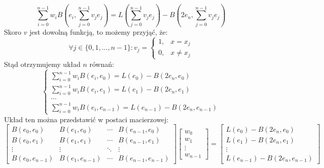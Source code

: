 \documentclass[a4paper,12pt]{article}
\begin{document}
    \begin{equation*}
        \sum_{i=0}^{n-1} w_i B\left(e_i, \sum_{j=0}^{n-1} v_j e_j\right) = L\left(\sum_{j=0}^{n-1} v_j e_j\right)-B\left(2e_n, \sum_{j=0}^{n-1} v_j e_j\right)
    \end{equation*}
    Skoro \(v\) jest dowolną funkcją, to możemy przyjąć, że:
    \begin{equation*}
        \forall j \in \{0,1,...,n-1\}: v_j = 
        \begin{cases}
            1,& x = x_j \\
            0,& x \neq x_j
        \end{cases}
    \end{equation*}
    Stąd otrzymujemy układ \(n\) równań:
    \begin{equation*}
        \begin{cases}
            \sum_{i=0}^{n-1} w_i B\left(e_i, e_0\right) = L\left(e_0\right)-B\left(2e_n, e_0\right) \\
            \sum_{i=0}^{n-1} w_i B\left(e_i, e_1\right) = L\left(e_1\right)-B\left(2e_n, e_1\right) \\
            \ldots \\
            \sum_{i=0}^{n-1} w_i B\left(e_i, e_{n-1}\right) = L\left(e_{n-1}\right)-B\left(2e_n, e_{n-1}\right)
        \end{cases}
    \end{equation*}
    Układ ten można przedstawić w postaci macierzowej:
    {\footnotesize
    \begin{equation*}
        \begin{bmatrix}
            B\left(e_0, e_0\right) & B\left(e_1, e_0\right) & \cdots & B\left(e_{n-1}, e_0\right) \\
            B\left(e_0, e_1\right) & B\left(e_1, e_1\right) & \cdots & B\left(e_{n-1}, e_1\right) \\
            \vdots & \vdots & \ddots & \vdots \\
            B\left(e_0, e_{n-1}\right) & B\left(e_1, e_{n-1}\right) & \cdots & B\left(e_{n-1}, e_{n-1}\right)
        \end{bmatrix}
        \begin{bmatrix}
            w_0 \\
            w_1 \\
            \vdots \\
            w_{n-1}
        \end{bmatrix}
        =
        \begin{bmatrix}
            L\left(e_0\right)-B\left(2e_n, e_0\right) \\
            L\left(e_1\right)-B\left(2e_n, e_1\right) \\
            \vdots \\
            L\left(e_{n-1}\right)-B\left(2e_n, e_{n-1}\right)
        \end{bmatrix}
    \end{equation*}
    }\\
\end{document}
